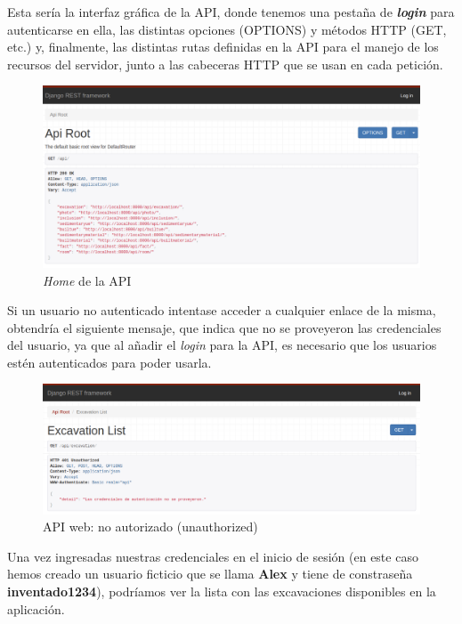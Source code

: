 Esta sería la interfaz gráfica de la API, donde tenemos una pestaña de
\textbf{\textit{login}} para autenticarse en ella, las distintas opciones (OPTIONS) y
métodos HTTP (GET, etc.) y, finalmente, las distintas rutas definidas en la API para el
manejo de los recursos del servidor, junto a las cabeceras HTTP que se usan en cada petición.

        \begin{figure}[H]
            \centering
            \includegraphics[scale=0.30]{imagenes/root-api.png}
            \caption{\textit{Home} de la API}
            \label{fig:root-api}
        \end{figure}

\newpage Si un usuario no autenticado intentase acceder a cualquier enlace de la misma, obtendría el
siguiente mensaje, que indica que no se proveyeron las credenciales del usuario, ya que al
añadir el \textit{login} para la API, es necesario que los usuarios estén autenticados para
poder usarla.

        \begin{figure}[H]
            \centering
            \includegraphics[scale=0.30]{imagenes/unauthorized.png}
            \caption{API web: no autorizado (unauthorized)}
            \label{fig:unauthorized}
        \end{figure}

Una vez ingresadas nuestras credenciales en el inicio de sesión (en este caso hemos creado
un usuario ficticio que se llama \textbf{Alex} y tiene de constraseña \textbf{inventado1234}),
podríamos ver la lista con las excavaciones disponibles en la aplicación.

